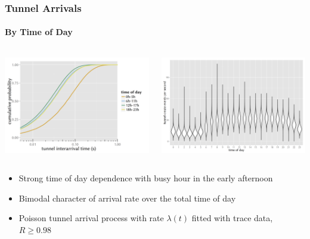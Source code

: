 \documentclass{beamer}
\begin{document}
\begin{frame}
	\frametitle{Tunnel Arrivals}
	\framesubtitle{By Time of Day}
	\begin{columns}[T]
			\includegraphics[width=1.0\columnwidth]{extras/R-IAT-fromflows-ecdfs-2h.png}

			\includegraphics[width=1.0\columnwidth]{extras/R-createspersecond-1h-violin.png}
	\end{columns}

	\begin{itemize}
		\item Strong time of day dependence with busy hour in the early afternoon
		\item Bimodal character of arrival rate over the total time of day
		\item Poisson tunnel arrival process with rate $\lambda(t)$ fitted with trace data, $R \geq 0.98$
	\end{itemize}
\end{frame}
\end{document}
